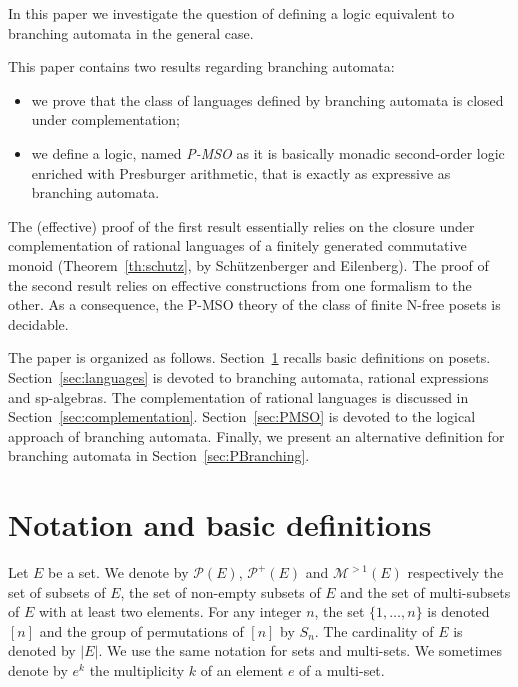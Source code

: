 \documentclass{CSML}
\begin{document}
In this paper we investigate the question of defining a logic equivalent to branching automata in the general case. 

This paper contains two results regarding branching automata:
\begin{itemize}
\item we prove that the class of languages defined by branching automata is closed under complementation;
\item we define a logic, named \emph{P-MSO} as it is basically monadic second-order logic enriched with Presburger arithmetic, that is exactly as expressive as branching automata.
\end{itemize}

\noindent The (effective) proof of the first result essentially relies on the closure under complementation of rational languages of a finitely generated commutative monoid (Theorem~\ref{th:schutz}, by Sch\"utzenberger and Eilenberg).
The proof of the second result relies on effective constructions from one formalism to the other.
As a consequence, the P-MSO theory of the class of finite N-free posets is decidable.

The paper is organized as follows. Section~\ref{sec:not} recalls basic definitions on posets. Section~\ref{sec:languages} is devoted to branching automata, rational expressions and sp-algebras. The complementation of rational languages is discussed in Section~\ref{sec:complementation}. Section~\ref{sec:PMSO} is devoted to the logical approach of branching automata. Finally, we present an alternative definition for branching automata in Section~\ref{sec:PBranching}.

\section{Notation and basic definitions}
\label{sec:not}

Let $E$ be a set. We denote by ${\mathcal P}(E)$, ${\mathcal P}^+(E)$ and ${\mathcal M}^{>1}(E)$ respectively the set of subsets of $E$, the set of non-empty subsets of $E$ and the set of multi-subsets of $E$ with at least two elements. 
For any integer $n$, the set $\{1,\dots,n\}$ is denoted $[n]$ and the group of permutations of $[n]$ by $S_n$.
The cardinality of $E$ is denoted by $\vert E\vert$.
We use the same notation for sets and multi-sets. We sometimes denote by $e^k$ the multiplicity $k$ of an element $e$ of a multi-set. 
\end{document}
